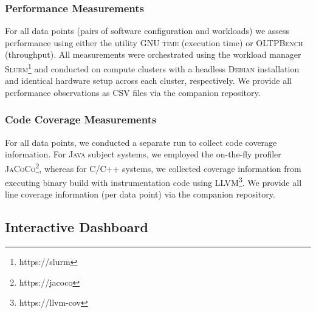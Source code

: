 \documentclass[10pt,conference]{IEEEtran}
\begin{document}
	\subsubsection{Performance Measurements}
	For all data points (pairs of software configuration and workloads) we assess performance using either the utility \textsc{GNU time} (execution time) or \textsc{OLTPBench}~\cite{difallah_oltp_2013} (throughput). All measurements were orchestrated using the workload manager \textsc{Slurm}\footnote{https://slurm} and conducted on compute clusters with a headless \textsc{Debian} installation and identical hardware setup across each cluster, respectively. We provide all performance observations as CSV files via the companion repository.
	
	\subsubsection{Code Coverage Measurements}
	For all data points, we conducted a separate run to collect code coverage information. For \textsc{Java} subject systems, we employed the on-the-fly profiler \textsc{JaCoCo}\footnote{https://jacoco}, whereas for \textsc{C/C++} systems, we collected coverage information from executing binary build with instrumentation code using LLVM\footnote{https://llvm-cov}. We provide all line coverage information (per data point) via the companion repository.
		
	\subsection{Interactive Dashboard}
	
	
	
\end{document}
